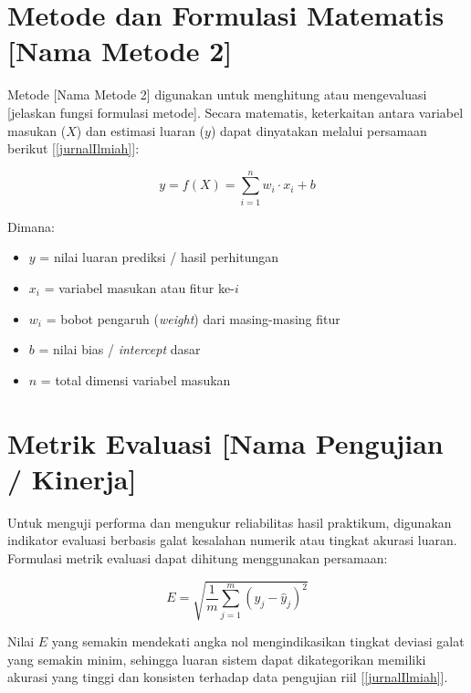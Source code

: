\section{Metode dan Formulasi Matematis [Nama Metode 2]}

Metode [Nama Metode 2] digunakan untuk menghitung atau mengevaluasi [jelaskan fungsi formulasi metode]. Secara matematis, keterkaitan antara variabel masukan ($X$) dan estimasi luaran ($y$) dapat dinyatakan melalui persamaan berikut [\ref{jurnalIlmiah}]:

\begin{equation}
    y = f(X) = \sum_{i=1}^{n} w_i \cdot x_i + b
    \label{eq:formulasi_dasar}
\end{equation}

Dimana:
\begin{itemize}
    \item $y$ = nilai luaran prediksi / hasil perhitungan
    \item $x_i$ = variabel masukan atau fitur ke-$i$
    \item $w_i$ = bobot pengaruh (\textit{weight}) dari masing-masing fitur
    \item $b$ = nilai bias / \textit{intercept} dasar
    \item $n$ = total dimensi variabel masukan
\end{itemize}

\section{Metrik Evaluasi [Nama Pengujian / Kinerja]}

Untuk menguji performa dan mengukur reliabilitas hasil praktikum, digunakan indikator evaluasi berbasis galat kesalahan numerik atau tingkat akurasi luaran. Formulasi metrik evaluasi dapat dihitung menggunakan persamaan:

\begin{equation}
    E = \sqrt{\frac{1}{m}\sum_{j=1}^{m}\left(y_{j} - \hat{y}_{j}\right)^2}
    \label{eq:metrik_evaluasi}
\end{equation}

Nilai $E$ yang semakin mendekati angka nol mengindikasikan tingkat deviasi galat yang semakin minim, sehingga luaran sistem dapat dikategorikan memiliki akurasi yang tinggi dan konsisten terhadap data pengujian riil [\ref{jurnalIlmiah}].
